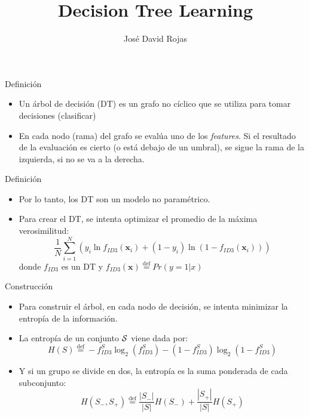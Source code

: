 \documentclass[aspectratio=169]{beamer}
\title{Decision Tree Learning}
\author{José David Rojas}
\date{}
\begin{document}
\begin{frame}[plain]
    \maketitle
\end{frame}
\begin{frame}{Definición}
	\begin{itemize}
		\item Un árbol de decisión (DT) es un grafo no cíclico que se utiliza para tomar decisiones (clasificar)
		\item En cada nodo (rama) del grafo se evalúa uno de los \textit{features}. Si el resultado de la evaluación es cierto (o está debajo de un umbral), se sigue la rama de la izquierda, si no se va a la derecha.
	\end{itemize}
	\begin{center}
		
	\end{center}
\end{frame}
%
\begin{frame}{Definición}
	\begin{itemize}
		\item Por lo tanto, los DT son un modelo no paramétrico.
		\item Para crear el DT, se \alert{intenta} optimizar el promedio de la máxima verosimilitud:
			\begin{equation*}
				\frac{1}{N} \sum_{i=1}^{N}\left( y_i \ln{f_{ID3}(\bm{x}_i)} + (1-y_i) \ln{(1-f_{ID3}(\bm{x}_i))}\right) 
			\end{equation*}
		donde $f_{ID3}$ es un DT y $f_{ID3}(\bm{x}) \stackrel{\text{def}}{=} Pr(y=1|x)$
	\end{itemize}
\end{frame}
%
\begin{frame}{Construcción}
	\begin{itemize}
		\item Para construir el árbol, en cada nodo de decisión, se intenta minimizar la entropía de la información.
		\item La entropía de un conjunto $\cal{S}$ viene dada por:
			\begin{equation*}
				H(S) \stackrel{\text{def}}{=} -f_{ID3}^{S} \log_2 (f_{ID3}^{S}) - (1-f_{ID3}^{S}) \log_2 (1-f_{ID3}^{S})
			\end{equation*}
		\item Y si un grupo se divide en dos, la entropía es la suma ponderada de cada subconjunto:
			\begin{equation*}
				H(S_-, S_+) \stackrel{\text{def}}{=} \frac{|S_-|}{|S|}H(S_-) + \frac{|S_+|}{|S|}H(S_+)
			\end{equation*}
	\end{itemize}
\end{frame}
\end{document}
